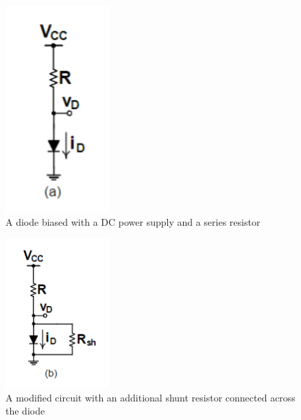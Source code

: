 

\begin{figure}[H]
    \centering
    \includegraphics[width=4cm]{Diode1.png}
    \caption{A diode biased with a DC power supply and a series resistor}
\end{figure}

\begin{figure}[H]
    \centering
    \includegraphics[width=4cm]{Diode2.png}
    \caption{A modified circuit with an additional shunt resistor connected across the diode}
\end{figure}

			